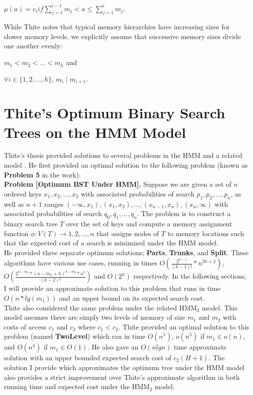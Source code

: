 \documentclass[letterpaper,12pt,titlepage,oneside,final]{book}
\theoremstyle{plain}
\begin{document}
\begin{center}$\mu (a) = c_i if \sum_{j = 1}^{i-1}m_j  < a \leq \sum_{j = 1}^{i}m_j$. \end{center}

While Thite notes that typical memory hierarchies have increasing sizes for slower memory levels, we explicitly assume that successive memory sizes divide one another evenly:
\begin{center}
$m_1 < m_2 < ... < m_h$ and
\end{center}
\begin{center}
$\forall i \in  \{1,2,...,h\}$, $m_i \mid m_{i+1}$.
\end{center}

\section{Thite's Optimum Binary Search Trees on the HMM Model}

Thite's thesis provided solutions to several problems in the HMM and a related model \cite{thite2008optimum}. He first provided an optimal solution to the following problem (known as \textbf{Problem 5} in the work):\\


\textbf{Problem [Optimum BST Under HMM].} Suppose we are given a set of $n$ ordered keys $x_1, x_2, ..., x_2$ with associated probabilities of search $p_1, p_2, ..., p_n$, as well as $n+1$ ranges $(- \infty, x_1), (x_1, x_2), ..., (x_{n-1}, x_n), (x_n, \infty)$ with associated probabilities of search $q_0, q_1, ..., q_n$. The problem is to construct a binary search tree $T$ over the set of keys and compute a memory assignment function $\phi : V (T) \rightarrow {1, 2, ..., n}$ that assigns nodes of $T$ to memory locations such that the expected cost of a search is minimized under the HMM model.\\


He provided three separate optimum solutions; \textbf{Parts}, \textbf{Trunks}, and \textbf{Split}. These algorithms have various use cases, running in times $O(\frac{2^{h-1}}{(h-1)!}* n^{2h+1})$, $O(\frac{2^{n-m_h}*(n-m_h+h)^{n-m_h}*n^3}{(h-2)!})$ and $O(2^n)$ respectively. In the following sections, I will provide an approximate solution to this problem that runs in time $O(n*lg(m_1))$ and an upper bound on its expected search cost.  \\

Thite also considered the same problem under the related HMM$_2$ model. This model assumes there are simply two levels of memory of size $m_1$ and $m_2$ with costs of access $c_1$ and $c_2$ where $c_1 < c_2$. Thite provided an optimal solution to this problem (named \textbf{TwoLevel}) which ran in time $O(n^5)$, $o(n^5)$ if $m_1 \in o(n)$, and $O(n^4)$ if $m_1 \in O(1)$. He also gave an $O(nlg n)$ time approximate solution with an upper bounded expected search cost of $c_2(H+1)$. The solution I provide which approximates the optimum tree under the HMM model also provides a strict improvement over Thite's approximate algorithm in both running time and expected cost under the HMM$_2$ model.
\end{document}
